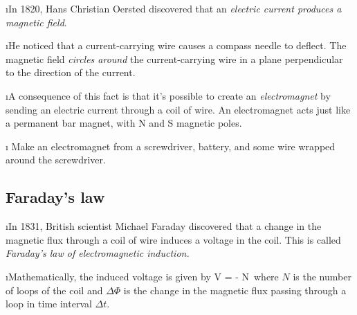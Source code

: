 \i In 1820, Hans Christian Oersted discovered that an {\em electric 
current produces a magnetic field}.

\i He noticed that a current-carrying wire causes a compass 
needle to deflect.
The magnetic field {\em circles around} the current-carrying wire 
in a plane perpendicular to the direction of the current.

\i A consequence of this fact is that it's possible to create an 
{\em electromagnet} by sending an electric current through a coil of wire.
An electromagnet acts just like a permanent bar magnet, with N and S 
magnetic poles.

\i \demo
Make an electromagnet from a screwdriver, battery, and
some wire wrapped around the screwdriver.

\ei

\subsection{Faraday's law}

\bi

\i In  1831, British scientist Michael Faraday discovered 
that a change in the magnetic flux through a coil of wire 
induces a voltage in the coil.
This is called {\em Faraday's law of electromagnetic induction.}

\i Mathematically, the induced voltage is given by
%
\be
V = - N\,
\ee
%
where $N$ is the number of loops of the coil and $\Delta\Phi$ 
is the change in the magnetic flux 
passing through a loop in time interval $\Delta t$.

